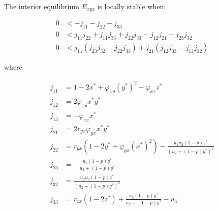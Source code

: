 \begin{theorem}\label{thm:eq-interior-stability}
    The interior equilibrium $E_{xyz}$ is locally stable when:

    \begin{align*}
        0 &< -j_{11}-j_{22}-j_{33}\\
        0 &< j_{11}j_{22}+j_{11}j_{33}+j_{22}j_{33}-j_{12}j_{21}-j_{23}j_{32}\\
        0 &< j_{11}\left(j_{23}j_{32}-j_{22}j_{33}\right)+j_{21}\left(j_{12}j_{33}-j_{13}j_{32}\right)
    \end{align*}

    where
    
    \begin{align*}
        j_{11} &= 1-2x^*+\varphi_{xy}\left(y^*\right)^2-\varphi_{xz}z^*\\
        j_{12} &= 2\varphi_{xy}x^*y^*\\
        j_{13} &= -\varphi_{xz}x^*\\
        j_{21} &= 2r_{yx}\varphi_{yx}x^*y^*\\
        j_{22} &= r_{yx}\left(1-2y^*+\varphi_{yx}\left(x^*\right)^2\right)-\frac{u_1u_2\left(1-p\right)z^*}{\left(u_2+\left(1-p\right)y^*\right)^2}\\
        j_{23} &= -\frac{u_1\left(1-p\right)y^*}{u_2+\left(1-p\right)y^*}\\
        j_{32} &= \frac{u_2u_3\left(1-p\right)z^*}{\left(u_2+\left(1-p\right)y^*\right)^2}\\
        j_{33} &= r_{zx}\left(1-2z^*\right)+\frac{u_3\left(1-p\right)y^*}{u_2+\left(1-p\right)y^*}-u_4
    \end{align*}
\end{theorem}
